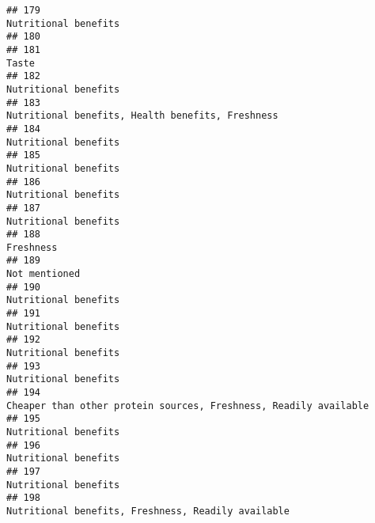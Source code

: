 \documentclass[
]{article}
\begin{document}
\begin{verbatim}
## 179                                                                                                       Nutritional benefits
## 180                                                                                                                           
## 181                                                                                                                      Taste
## 182                                                                                                       Nutritional benefits
## 183                                                                           Nutritional benefits, Health benefits, Freshness
## 184                                                                                                       Nutritional benefits
## 185                                                                                                       Nutritional benefits
## 186                                                                                                       Nutritional benefits
## 187                                                                                                       Nutritional benefits
## 188                                                                                                                  Freshness
## 189                                                                                                             Not mentioned 
## 190                                                                                                       Nutritional benefits
## 191                                                                                                       Nutritional benefits
## 192                                                                                                       Nutritional benefits
## 193                                                                                                       Nutritional benefits
## 194                                                           Cheaper than other protein sources, Freshness, Readily available
## 195                                                                                                       Nutritional benefits
## 196                                                                                                       Nutritional benefits
## 197                                                                                                       Nutritional benefits
## 198                                                                         Nutritional benefits, Freshness, Readily available

\end{verbatim}
\end{document}
